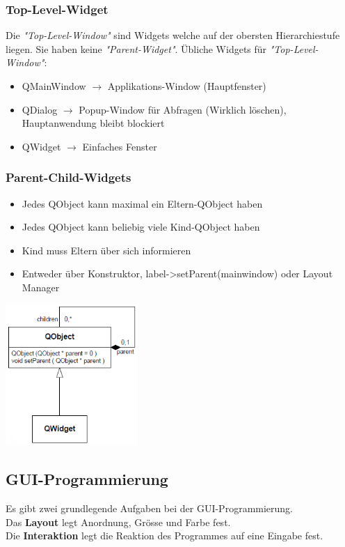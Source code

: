 \begin{multicols}{3}
\subsubsection{Top-Level-Widget}
Die \textit{"Top-Level-Window"} sind Widgets welche auf der obersten Hierarchiestufe liegen. Sie haben keine \textit{"Parent-Widget"}.
Übliche Widgets für \textit{"Top-Level-Window"}: 
\begin{itemize}
	\item QMainWindow $\rightarrow$ Applikations-Window (Hauptfenster)
	\item QDialog $\rightarrow$ Popup-Window für Abfragen (Wirklich löschen), Hauptanwendung bleibt blockiert
	\item QWidget $\rightarrow$ Einfaches Fenster
\end{itemize}

\subsubsection{Parent-Child-Widgets}
\begin{itemize}
	\item Jedes QObject kann maximal ein Eltern-QObject haben
	\item Jedes QObject kann beliebig viele Kind-QObject haben
	\item Kind muss Eltern über sich informieren
	\item Entweder über Konstruktor, label->setParent(mainwindow) oder Layout Manager
\end{itemize}

\includegraphics[width=5cm]{images/qt_parent_child.png}
\end{multicols}


\subsection{GUI-Programmierung}
Es gibt zwei grundlegende Aufgaben bei der GUI-Programmierung.\\
Das \textbf{Layout} legt Anordnung, Grösse  und Farbe fest.\\
Die \textbf{Interaktion} legt die Reaktion des Programmes auf eine Eingabe fest. \\

